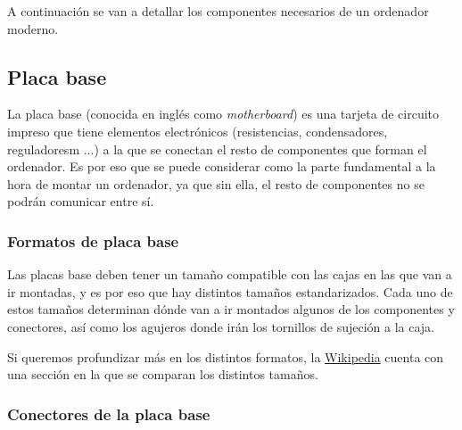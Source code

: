A continuación se van a detallar los componentes necesarios de un ordenador moderno.


\subsection{Placa base}

La placa base (conocida en inglés como \textit{motherboard}) es una tarjeta de circuito impreso que tiene elementos electrónicos (resistencias, condensadores, reguladoresm ...)  a la que se conectan el resto de componentes que forman el ordenador. Es por eso que se puede considerar como la parte fundamental a la hora de montar un ordenador, ya que sin ella, el resto de componentes no se podrán comunicar entre sí.


\subsubsection{Formatos de placa base}
Las placas base deben tener un tamaño compatible con las cajas en las que van a ir montadas, y es por eso que hay distintos tamaños estandarizados. Cada uno de estos tamaños determinan dónde van a ir montados algunos de los componentes y conectores, así como los agujeros donde irán los tornillos de sujeción a la caja.

Si queremos profundizar más en los distintos formatos, la \href{https://es.wikipedia.org/wiki/Placa_base#Formatos_de_placa_base}{Wikipedia} cuenta con una sección en la que se comparan los distintos tamaños.


\subsubsection{Conectores de la placa base}

